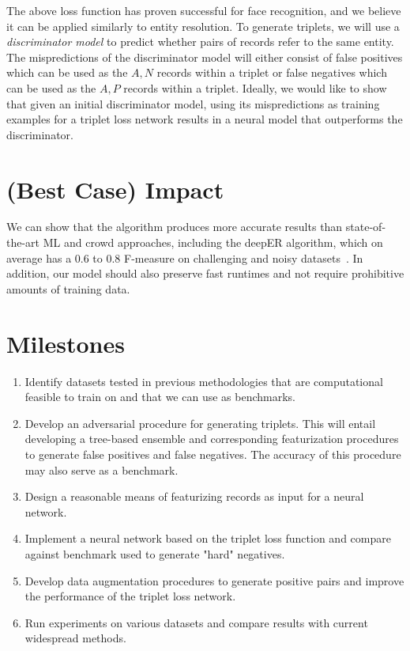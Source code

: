 \documentclass{proc}
\begin{document}
The above loss function has proven successful for face recognition, and we believe it can be applied similarly to entity resolution. To generate triplets,  we will use a \emph{discriminator model} to predict whether pairs of records refer to the same entity. The mispredictions of the discriminator model will either consist of false positives which can be used as the $A, N$ records within a triplet or false negatives which can be used as the $A, P$  records within a triplet. Ideally, we would like to show that given an initial discriminator model, using its mispredictions as training examples for a triplet loss network results in a neural model that outperforms the discriminator.

\section{(Best Case) Impact}

We can show that the algorithm produces more accurate results than state-of-the-art ML and crowd approaches, including the deepER algorithm, which on average has a 0.6 to 0.8 F-measure on challenging and noisy datasets~\cite{ebraheem2017deeper}. In addition, our model should also preserve fast runtimes and not require prohibitive amounts of training data. 

\section{Milestones}

\begin{enumerate}
  \item Identify datasets tested in previous methodologies that are computational feasible to train on and that we can use as benchmarks.
  \item Develop an adversarial procedure for generating triplets. This will entail developing a tree-based ensemble and corresponding featurization procedures to generate false positives and false negatives. The accuracy of this procedure may also serve as a benchmark.
  \item Design a reasonable means of featurizing records as input for a neural network.
  \item Implement a neural network based on the triplet loss function and compare against benchmark used to generate "hard" negatives.
  \item Develop data augmentation procedures to generate positive pairs and  improve the performance of the triplet loss network.
  \item Run experiments on various datasets and compare results with current widespread methods.
\end{enumerate}
\end{document}
